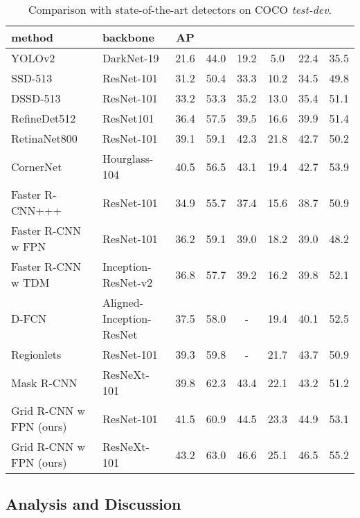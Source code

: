 \documentclass[10pt,twocolumn,letterpaper]{article}
\begin{document}
\begin{table*}[t]
\begin{center}
\begin{tabular}{ l | l | c | c  c | c  c  c }
\hline
method & backbone & AP &  &  &  &  &  \\
\hline
YOLOv2~\cite{redmon2016yolo9000} & DarkNet-19  & 21.6 & 44.0 & 19.2 & 5.0 & 22.4 & 35.5 \\
SSD-513~\cite{DBLP:journals/corr/LiuAESR15} & ResNet-101  & 31.2 & 50.4 & 33.3 & 10.2 & 34.5 & 49.8 \\
DSSD-513~\cite{fu2017dssd} & ResNet-101  & 33.2 & 53.3 & 35.2 & 13.0 & 35.4 & 51.1 \\
RefineDet512~\cite{zhang2017single} & ResNet101  & 36.4 & 57.5 & 39.5 & 16.6 & 39.9 & 51.4 \\
RetinaNet800~\cite{lin2018focal} & ResNet-101  & 39.1 & 59.1 & 42.3 & 21.8 & 42.7 & 50.2 \\
CornerNet & Hourglass-104  & 40.5 & 56.5 & 43.1 & 19.4 & 42.7 & 53.9 \\
\hline
Faster R-CNN+++~\cite{he2016deep} & ResNet-101  & 34.9 & 55.7 & 37.4 & 15.6 & 38.7 & 50.9 \\
Faster R-CNN w FPN~\cite{lin2017feature} & ResNet-101  & 36.2 & 59.1 & 39.0 & 18.2 & 39.0 & 48.2 \\
Faster R-CNN w TDM~\cite{shrivastava2016beyond} & Inception-ResNet-v2~\cite{szegedy2017inception}  & 36.8 & 57.7 & 39.2 & 16.2 & 39.8 & 52.1 \\
D-FCN~\cite{dai2017deformable} & Aligned-Inception-ResNet & 37.5 & 58.0 & - & 19.4 & 40.1 & 52.5 \\
Regionlets~\cite{xu2017deep} & ResNet-101 & 39.3 & 59.8 & - & 21.7 & 43.7 & 50.9 \\
Mask R-CNN~\cite{he2017mask}  & ResNeXt-101 & 39.8 & 62.3 & 43.4 & 22.1 & 43.2 & 51.2 \\
Grid R-CNN w FPN (ours) & ResNet-101 & 41.5 & 60.9 & 44.5 & 23.3 & 44.9 & 53.1 \\
Grid R-CNN w FPN (ours) & ResNeXt-101  & 43.2 & 63.0 & 46.6 & 25.1 & 46.5 & 55.2 \\
\end{tabular}
\vspace{1mm}
\caption{Comparison with state-of-the-art detectors on COCO \textit{test-dev}.}
\label{tab:test}
\end{center}
\end{table*}


\subsection{Analysis and Discussion}
\end{document}
